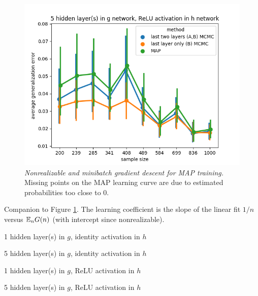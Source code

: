 \documentclass{article} %
\begin{document}
\begin{figure}[t!]
\begin{center}
		\includegraphics[scale=0.35]{taskid7.png}
	\end{center}
	\caption{\textit{Nonrealizable and minibatch gradient descent for MAP training.} Missing points on the MAP learning curve are due to estimated probabilities too close to 0.}
	\label{fig:avg_gen_err_minibatch_nonrealizable}
\end{figure}


\begin{table}[h!]%
	\centering
	\caption{Companion to Figure \ref{fig:avg_gen_err_minibatch_nonrealizable}. The learning coefficient is the slope of the linear fit $1/n$ versus $\mathbb{E}_n G(n)$ (with intercept since nonrealizable).}%
	\label{table::avg_gen_err_minibatch_nonrealizable}%
	\begin{tiny}
	\begin{subtable}[t]{2.5in}
		\caption{1 hidden layer(s) in $g$, identity activation in $h$}		
	\end{subtable}
	\quad
	\begin{subtable}[t]{2.5in}
		\caption{5 hidden layer(s) in $g$, identity activation in $h$}		
	\end{subtable}
	\quad
	\begin{subtable}[t]{2.5in}
		\caption{1 hidden layer(s) in $g$, ReLU activation in $h$}		
	\end{subtable}
	\quad
	\begin{subtable}[t]{2.5in}
		\caption{5 hidden layer(s) in $g$, ReLU activation in $h$}		
	\end{subtable}
	\end{tiny}
\end{table}
\end{document}
